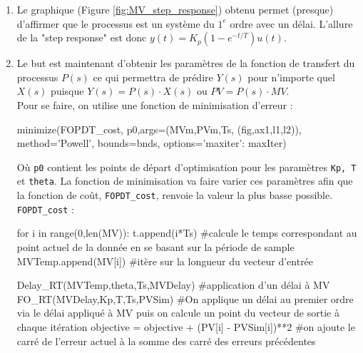 \documentclass{article}
\begin{document}
\begin{enumerate}
    \item Le graphique (Figure \ref{fig:MV_step_response}) obtenu permet (presque) d'affirmer que le processus est un système du $1^{e}$ ordre avec un délai. L'allure de la "step response" est donc $y(t) = K_p (1-e^{-t/T})u(t)$.

    \item Le but est maintenant d'obtenir les paramètres de la fonction de transfert du processus $P(s)$ ce qui permettra de prédire $Y(s)$ pour n'importe quel $X(s)$ puisque $Y(s) = P(s) \cdot X(s)$ ou $PV = P(s)\cdot MV$. 
    \\Pour se faire, on utilise une fonction de minimisation d'erreur : 
    \begin{python*}
        minimize(FOPDT_cost,
            p0,args=(MVm,PVm,Ts,
            (fig,ax1,l1,l2)), 
            method='Powell',
            bounds=bnds,
            options={'maxiter': maxIter})
    \end{python*}

    Où \texttt{p0} contient les points de départ d'optimisation pour les paramètres \texttt{Kp, T} et \texttt{theta}. La fonction de minimisation va faire varier ces paramètres afin que la fonction de coût, \texttt{FOPDT\_cost}, renvoie la valeur la plus basse possible. 
    \\ \texttt{FOPDT\_cost} : 

    \begin{python*}
        for i in range(0,len(MV)):
            t.append(i*Ts) #calcule le temps correspondant au point actuel                  de la donnée en se basant sur la période de sample
            MVTemp.append(MV[i]) #itère sur la longueur du vecteur d'entrée

            Delay_RT(MVTemp,theta,Ts,MVDelay) #application d'un délai à MV  
            FO_RT(MVDelay,Kp,T,Ts,PVSim) #On applique un délai au premier ordre via le délai appliqué à MV puis on calcule un point du vecteur de sortie à chaque itération 
            objective = objective + (PV[i] - PVSim[i])**2 #on ajoute le carré de l'erreur actuel à la somme des carré des erreurs précédentes   
    \end{python*}
\end{enumerate}
\end{document}
